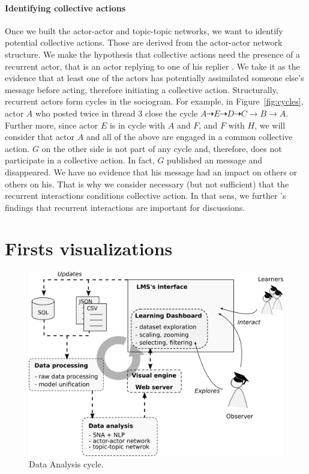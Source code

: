 \documentclass[a4paper,twoside]{article}
\begin{document}
\paragraph{Identifying collective actions}

Once we built the actor-actor and topic-topic networks,  we want to identify potential collective actions.  Those are derived from the actor-actor network structure.
We make the hypothesis that collective actions need the presence of a recurrent actor, that is an actor replying to one of his replier \citep{Chua2017}.  We take it as the evidence that at least one of the actors has potentially assimilated someone else's message before acting, therefore initiating a collective action.
Structurally, recurrent actors form cycles in the sociogram.  For example, in Figure~\ref{fig:cycles}, actor $A$ who posted twice in thread 3 close the cycle $A \dashrightarrow E  \dashrightarrow  D  \dashrightarrow C \to B \to A$.  Further more, since actor $E$ is in cycle with $A$ and $F$, and $F$ with $H$, we will consider that actor $A$ and all of the above are engaged in a common collective action.  $G$ on the other side is not part of any cycle and, therefore, does not participate in a collective action.  In fact, $G$ published an message and disappeared.  We have no evidence that his message had an impact on others or others on his.  That is why we consider necessary (but not sufficient) that the recurrent interactions conditions collective action.   In that sens, we further \cite{Chua2017}'s findings that recurrent interactions are important for discussions.

\section{Firsts visualizations}
\label{section:5}

\begin{figure}[t]
  \includegraphics[width=.5\textwidth]{images/pipeline.png}
  \small{
    \caption{\label{fig:pipeline} Data Analysis cycle.
    }}
\end{figure}
\end{document}

